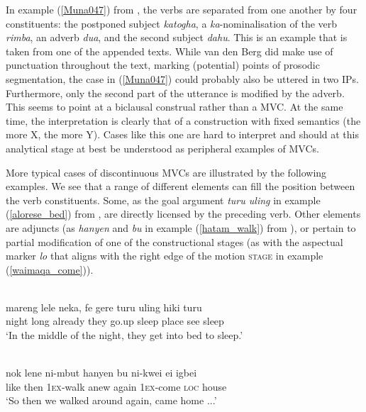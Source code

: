 In example (\ref{Muna047}) from , the verbs are separated from one another by four constituents: the postponed subject \textit{katogha}, a \textit{ka}-nominalisation of the verb \textit{rimba}, an adverb \textit{dua}, and the second subject \textit{dahu}. This is an example that is taken from one of the appended texts. While van den Berg did make use of punctuation throughout the text, marking (potential) points of prosodic segmentation, the case in (\ref{Muna047}) could probably also be uttered in two IPs. Furthermore, only the second part of the utterance is modified by the adverb. This seems to point at a biclausal construal rather than a MVC. At the same time, the interpretation is clearly that of a construction with fixed semantics (the more X, the more Y). Cases like this one are hard to interpret and should at this analytical stage at best be understood as peripheral examples of MVCs.

More typical cases of discontinuous MVCs are illustrated by the following examples. We see that a range of different elements can fill the position between the verb constituents. Some, as the goal argument \textit{turu uling} in example (\ref{alorese_bed}) from , are directly licensed by the preceding verb. Other elements are adjuncts (as \textit{hanyen} and \textit{bu} in example (\ref{hatam_walk}) from ), or pertain to partial modification of one of the constructional stages (as with the aspectual marker \textit{lo} that aligns with the right edge of the motion \textsc{stage} in example (\ref{waimaqa_come})).

\ea \label{alorese_bed}
\\
\gll mareng lele neka, fe gere turu uling hiki turu \\
night long already they go.up sleep place see sleep \\
\glft `In the middle of the night, they get into bed to sleep.'\\ 
\z

\ea \label{hatam_walk}
\\
\gll nok lene ni-mbut hanyen bu ni-kwei ei igbei \\
like then 1\textsc{ex}-walk anew again 1\textsc{ex}-come \textsc{loc} house \\
\glft `So then we walked around again, came home ...'\\ 
\z

